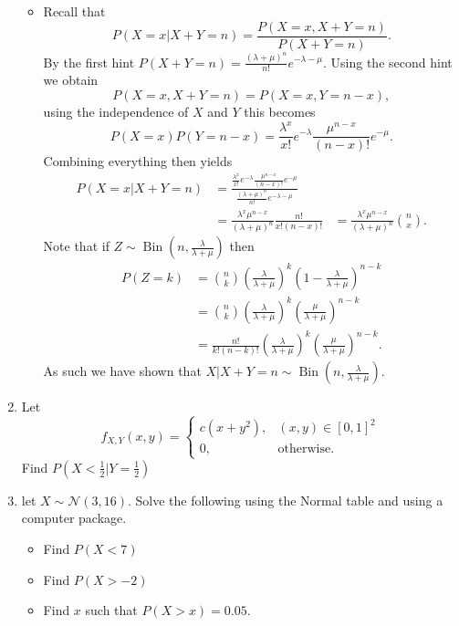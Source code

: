 \documentclass{article}
\begin{document}
\begin{enumerate}
		\begin{itemize}
			\item Recall that
			$$
			P(X = x|X + Y = n) = \frac{P(X = x, X + Y = n)}{P(X + Y = n)}.
			$$
			By the first hint $P(X + Y = n) = \frac{(\lambda + \mu)^n}{n!} e^{-\lambda -\mu}$. Using the second hint we obtain
			$$
			P(X = x, X + Y = n) = P(X = x, Y = n - x),
			$$
			using the independence of $X$ and $Y$ this becomes
			$$
			P(X = x)P(Y = n - x) = \frac{\lambda^x}{x!} e^{-\lambda} \frac{\mu^{n - x}}{(n - x)!}e^{-\mu}.
			$$
			Combining everything then yields
			$$
			\begin{aligned}
			P(X = x|X + Y = n) &= \frac{\frac{\lambda^x}{x!} e^{-\lambda} \frac{\mu^{n - x}}{(n - x)!}e^{-\mu}}{\frac{(\lambda + \mu)^n}{n!} e^{-\lambda-\mu}} \\
			&= \frac{\lambda^x \mu^{n - x}}{(\lambda + \mu)^n} \frac{n!}{x! (n - x)!}
			&= \frac{\lambda^x \mu^{n - x}}{(\lambda + \mu)^n} \binom{n}{x}.
			\end{aligned}
			$$
			Note that if $Z \sim \operatorname{Bin}\left(n, \frac{\lambda}{\lambda + \mu}\right)$ then
			$$
			\begin{aligned}
			P(Z = k) &= \binom{n}{k} \left(\frac{\lambda}{\lambda + \mu}\right)^k \left( 1 - \frac{\lambda}{\lambda + \mu} \right)^{n - k} \\
			&= \binom{n}{k} \left(\frac{\lambda}{\lambda + \mu}\right)^k \left( \frac{\mu}{\lambda + \mu}\right)^{n - k} \\
			&= \frac{n!}{k!(n - k)!} \left(\frac{\lambda}{\lambda + \mu}\right)^k \left( \frac{\mu}{\lambda + \mu}\right)^{n - k}.
			\end{aligned}
			$$
			As such we have shown that $X|X + Y = n \sim \operatorname{Bin}\left(n, \frac{\lambda}{\lambda + \mu}\right)$.
		\end{itemize}
	\item Let
	$$
	f_{X, Y}(x, y) = \begin{cases}
	c(x + y^2),& (x, y) \in [0, 1]^2 \\
	0,& \text{otherwise}.
	\end{cases}
	$$
	Find $P\left(X < \frac{1}{2}| Y = \frac{1}{2}\right)$
	\item let $X \sim \mathcal{N}(3, 16)$. Solve the following using the Normal table and using a computer package.
		\begin{itemize}
			\item Find $P(X < 7)$
			\item Find $P(X > -2)$
			\item Find $x$ such that $P(X > x) = 0.05$.

\end{itemize}
\end{enumerate}
\end{document}
